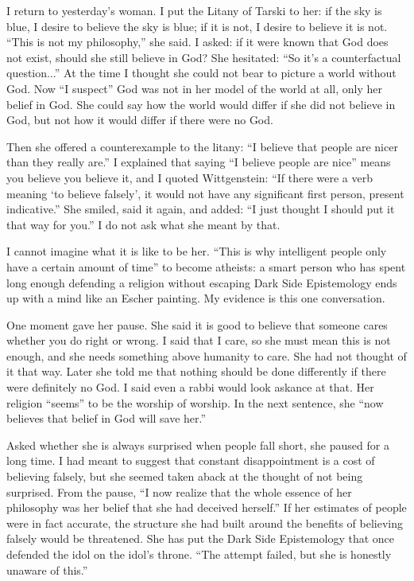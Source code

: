 
I return to yesterday's woman. I put the Litany of Tarski to her: if the sky is blue, I desire to believe the sky is blue; if it is not, I desire to believe it is not. ``This is not my philosophy,'' she said. I asked: if it were known that God does not exist, should she still believe in God? She hesitated: ``So it's a counterfactual question...'' At the time I thought she could not bear to picture a world without God. Now ``I suspect'' God was not in her model of the world at all, only her belief in God. She could say how the world would differ if she did not believe in God, but not how it would differ if there were no God. 

Then she offered a counterexample to the litany: ``I believe that people are nicer than they really are.'' I explained that saying ``I believe people are nice'' means you believe you believe it, and I quoted Wittgenstein: ``If there were a verb meaning `to believe falsely', it would not have any significant first person, present indicative.''  She smiled, said it again, and added: ``I just thought I should put it that way for you.'' I do not ask what she meant by that.

I cannot imagine what it is like to be her. ``This is why intelligent people only have a certain amount of time'' to become atheists: a smart person who has spent long enough defending a religion without escaping Dark Side Epistemology ends up with a mind like an Escher painting. My evidence is this one conversation.

One moment gave her pause. She said it is good to believe that someone cares whether you do right or wrong. I said that I care, so she must mean this is not enough, and she needs something above humanity to care. She had not thought of it that way. Later she told me that nothing should be done differently if there were definitely no God. I said even a rabbi would look askance at that. Her religion ``seems'' to be the worship of worship. In the next sentence, she ``now believes that belief in God will save her.''

Asked whether she is always surprised when people fall short, she paused for a long time. I had meant to suggest that constant disappointment is a cost of believing falsely, but she seemed taken aback at the thought of not being surprised. From the pause, ``I now realize that the whole essence of her philosophy was her belief that she had deceived herself.'' If her estimates of people were in fact accurate, the structure she had built around the benefits of believing falsely would be threatened. She has put the Dark Side Epistemology that once defended the idol on the idol's throne. ``The attempt failed, but she is honestly unaware of this.''

